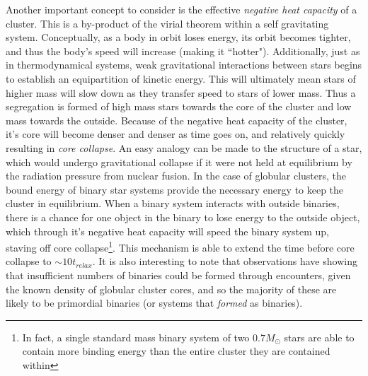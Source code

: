 \documentclass[aps,
                pra,  
                a4paper, 
                amsmath, 
                amssymb, 
                preprint,
                tightenlines,  
                amsfonts,
                nofootinbib,
            ]{revtex4-2}
\begin{document}
Another important concept to consider is the effective \textit{negative heat capacity} of a cluster. This is a by-product of the virial theorem within a self gravitating system. Conceptually, as a body in orbit loses energy, its orbit becomes tighter, and thus the body's speed will increase (making it ``hotter"). Additionally, just as in thermodynamical systems, weak gravitational interactions between stars begins to establish an equipartition of kinetic energy. This will ultimately mean stars of higher mass will slow down as they transfer speed to stars of lower mass. Thus a segregation is formed of high mass stars towards the core of the cluster and low mass towards the outside. Because of the negative heat capacity of the cluster, it's core will become denser and denser as time goes on, and relatively quickly resulting in \textit{core collapse}. An easy analogy can be made to the structure of a star, which would undergo gravitational collapse if it were not held at equilibrium by the radiation pressure from nuclear fusion. In the case of globular clusters, the bound energy of binary star systems provide the necessary energy to keep the cluster in equilibrium. When a binary system interacts with outside binaries, there is a chance for one object in the binary to lose energy to the outside object, which through it's negative heat capacity will speed the binary system up, staving off core collapse\footnote{In fact, a single standard mass binary system of two $0.7M_{\odot}$ stars are able to contain more binding energy than the entire cluster they are contained within}. This mechanism is able to extend the time before core collapse to $\sim 10t_{relax}$. It is also interesting to note that observations have showing that insufficient numbers of binaries could be formed through encounters, given the known density of globular cluster cores, and so the majority of these are likely to be primordial binaries (or systems that \textit{formed} as binaries).
\end{document}
